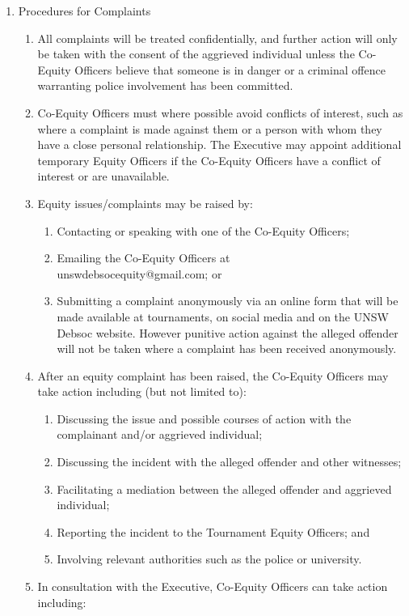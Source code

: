 \begin{enumerate}
\item Procedures for Complaints
  \begin{enumerate}
  \item All complaints will be treated confidentially, and further action will only be taken with the consent of the aggrieved individual unless the Co-Equity Officers believe that someone is in danger or a criminal offence warranting police involvement has been committed.
  \item Co-Equity Officers must where possible avoid conflicts of interest, such as where a complaint is made against them or a person with whom they have a close personal relationship. The Executive may appoint additional temporary Equity Officers if the Co-Equity Officers have a conflict of interest or are unavailable.
  \item Equity issues/complaints may be raised by:
    \begin{enumerate}
    \item Contacting or speaking with one of the Co-Equity Officers;
    \item Emailing the Co-Equity Officers at \\unswdebsocequity@gmail.com; or
    \item Submitting a complaint anonymously via an online form that will be made available at tournaments, on social media and on the UNSW Debsoc website. However punitive action against the alleged offender will not be taken where a complaint has been received anonymously.
    \end{enumerate}
  \item After an equity complaint has been raised, the Co-Equity Officers may take action including (but not limited to):
    \begin{enumerate}
    \item Discussing the issue and possible courses of action with the complainant and/or aggrieved individual;
    \item Discussing the incident with the alleged offender and other witnesses;
    \item Facilitating a mediation between the alleged offender and aggrieved individual;
    \item Reporting the incident to the Tournament Equity Officers; and
    \item Involving relevant authorities such as the police or university.
    \end{enumerate}
  \item In consultation with the Executive, Co-Equity Officers can take action including:

\end{enumerate}
\end{enumerate}
